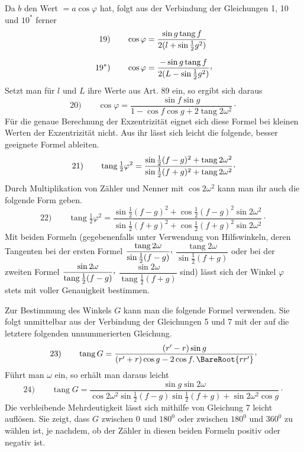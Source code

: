 Da $b$ den Wert $=a\cos\varphi$ hat, folgt aus der Verbindung der Gleichungen 1, 10 und $10^{\ast}$ ferner
\[
\begin{aligned}
\mathrm{19)}\qquad \cos\varphi&=\dfrac{\sin g\operatorname{tang}f}{2(l+\sin\frac12 g^2)}\\[6pt]
\mathrm{19}^{\ast}\mathrm{)}\qquad \cos\varphi&=\dfrac{-\sin g\operatorname{tang}f}{2(L-\sin\frac12 g^2)}\mathpunct{\raisebox{.45ex}{,}}
\end{aligned}
\]
Setzt man für $l$ und $L$ ihre Werte aus Art. 89 ein, so ergibt sich daraus
\[
\mathrm{20)}\qquad \cos\varphi=\dfrac{\sin f\sin g}{1-\cos f\cos g+2\operatorname{tang}2\omega^2}\mathpunct{\cdot}
\]
Für die genaue Berechnung der Exzentrizität eignet sich diese Formel bei kleinen Werten der Exzentrizität nicht. Aus ihr lässt sich leicht die folgende, besser geeignete Formel ableiten.
\[
\mathrm{21)}\qquad \operatorname{tang}\tfrac12\varphi^2=\dfrac{\sin\frac12(f-g)^2+\operatorname{tang}2\omega^2}{\sin\frac12(f+g)^2+\operatorname{tang}2\omega^2}\mathpunct{\raisebox{.45ex}{,}}
\]
Durch Multiplikation von Zähler und Nenner mit $\cos 2\omega^2$ kann man ihr auch die folgende Form geben.
\[
\mathrm{22)}\qquad \operatorname{tang}\tfrac12\varphi^2=\dfrac{\sin\frac12(f-g)^2+\cos\frac12(f-g)^2\sin 2\omega^2}{\sin\frac12(f+g)^2+\cos\frac12(f+g)^2\sin 2\omega^2}\mathpunct{\cdot}
\]
Mit beiden Formeln (gegebenenfalls unter Verwendung von Hilfswinkeln, deren Tangenten bei der ersten Formel $\dfrac{\operatorname{tang}2\omega}{\sin\frac12(f-g)}\mathpunct{\raisebox{.45ex}{,}}$ $\dfrac{\operatorname{tang}2\omega}{\sin\frac12(f+g)}$ oder bei der zweiten Formel $\dfrac{\sin 2\omega}{\operatorname{tang}\frac12(f-g)}\mathpunct{\raisebox{.45ex}{,}}$ $\dfrac{\sin 2\omega}{\operatorname{tang}\frac12(f+g)}$ sind) lässt sich der Winkel $\varphi$ stets mit voller Genauigkeit bestimmen.

Zur Bestimmung des Winkels $G$ kann man die folgende Formel verwenden. Sie folgt unmittelbar aus der Verbindung der Gleichungen 5 und 7 mit der auf die letztere folgenden unnummerierten Gleichung.
\[
\mathrm{23)}\qquad \operatorname{tang}G=\dfrac{(r'-r)\sin g}{(r'+r)\cos g-2\cos f\mathpunct{.}\BareRoot{rr'}}\mathpunct{\raisebox{.45ex}{,}}
\]
Führt man $\omega$ ein, so erhält man daraus leicht
\[
\mathrm{24)}\qquad \operatorname{tang}G=\dfrac{\sin g\sin 2\omega}{\cos 2\omega^2\sin\frac12(f-g)\sin\frac12(f+g)+\sin 2\omega^2\cos g}\mathpunct{\cdot}
\]
Die verbleibende Mehrdeutigkeit lässt sich mithilfe von Gleichung 7 leicht auflösen. Sie zeigt, dass $G$ zwischen 0 und $180^0$ oder zwischen $180^0$ und $360^0$ zu wählen ist, je nachdem, ob der Zähler in diesen beiden Formeln positiv oder negativ ist.

